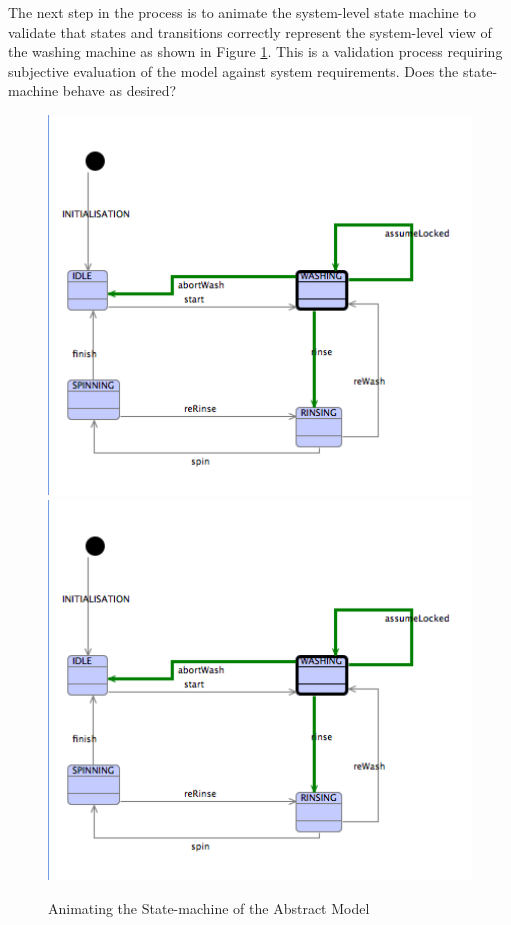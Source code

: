 The next step in the process is to animate the system-level state machine to validate that states and transitions correctly represent the system-level view of the washing machine as shown in Figure \ref{fig:AnimatingTheStatemachineOfTheAbstractModel}. This is a validation process requiring subjective evaluation of the model against system requirements. Does the state-machine behave as desired?

 \begin{figure}[!htbp]
  \centering
  \ifplastex
  \includegraphics[width=1024]{figures/image15.png}
  \else
  \includegraphics[width=1\textwidth]{figures/image15.png}
  \fi
  \caption{Animating the State-machine of the Abstract Model}
  \label{fig:AnimatingTheStatemachineOfTheAbstractModel}
\end{figure} 

